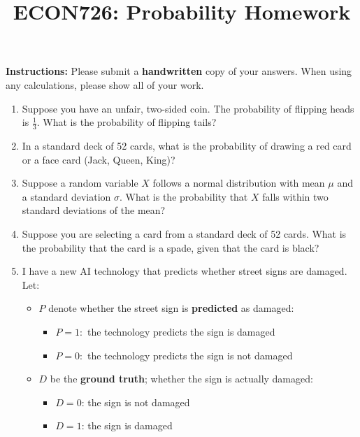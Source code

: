 \documentclass[11 pt]{article}
\begin{document}
\title{ECON726: Probability Homework}
\author{}
\date{\vspace{-5ex}}

\maketitle
\noindent \textbf{Instructions:} Please submit a \textbf{handwritten} copy of your answers. When using any calculations, please show all of your work. 

\begin{enumerate}
\item Suppose you have an unfair, two-sided coin. The probability of flipping heads is $\frac{1}{3}$. What is the probability of flipping tails?
\item In a standard deck of 52 cards, what is the probability of drawing a red card or a face card (Jack, Queen, King)?
\item Suppose a random variable $X$ follows a normal distribution with mean $\mu$ and a standard deviation $\sigma$. What is the probability that $X$ falls within two standard deviations of the mean?
\item Suppose you are selecting a card from a standard deck of 52 cards. What is the probability that the card is a spade, given that the card is black?
\item I have a new AI technology that predicts whether street signs are damaged. Let:
\begin{itemize}
    \item $P$ denote whether the street sign is \textbf{predicted} as damaged:
    \begin{itemize}
        \item $P = 1:$ the technology predicts the sign is damaged
        \item $P = 0:$ the technology predicts the sign is not damaged
    \end{itemize}
    \item $D$ be the \textbf{ground truth}; whether the sign is actually damaged:
    \begin{itemize}
        \item $D=0$: the sign is not damaged 
        \item $D=1$: the sign is damaged
    \end{itemize}
\end{itemize}


\end{enumerate}
\end{document}
